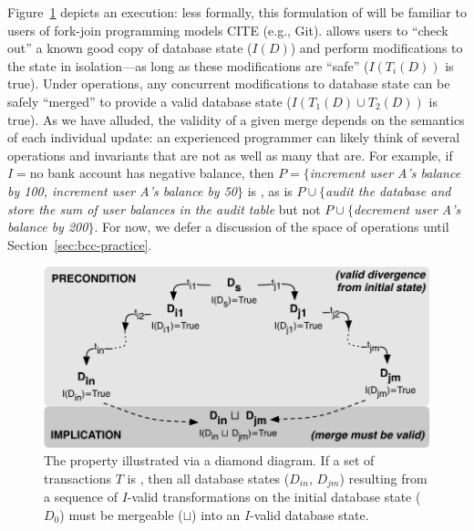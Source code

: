 Figure~\ref{fig:iconfluence} depicts an \iconfluent execution: less
formally, this formulation of \iconfluence will be familiar to users
of fork-join programming models CITE (e.g., Git). \iconfluence allows
users to ``check out'' a known good copy of database state ($I(D)$)
and perform modifications to the state in isolation---as long as these
modifications are ``safe'' ($I(T_i(D))$ is true). Under \iconfluent
operations, any concurrent modifications to database state can be
safely ``merged'' to provide a valid database state ($I(T_1(D) \cup
T_2(D))$ is true). As we have alluded, the validity of a given merge
depends on the semantics of each individual update: an experienced
programmer can likely think of several operations and invariants that
are not \iconfluent as well as many that are. For example, if $I=$no
bank account has negative balance, then $P=\{$\textit{increment user
  A's balance by 100, increment user A's balance by 50}$\}$ is
\iconfluent, as is $P\cup\{$\textit{audit the database and store the
  sum of user balances in the \textrm{audit} table} but not
$P\cup\{$\textit{decrement user A's balance by 200}$\}$. For now, we
defer a discussion of the space of operations until
Section~\ref{sec:bcc-practice}.

\begin{figure}
\begin{center}
\includegraphics[width=\columnwidth]{figs/icommute.pdf}
\end{center}
\caption{The \iconfluence property illustrated via a diamond
  diagram. If a set of transactions $T$ is \iconfluent, then all
  database states ($D_{in}$, $D_{jm}$) resulting from a sequence of
  $I$-valid transformations on the initial database state ($D_0$) must
  be mergeable ($\sqcup$) into an $I$-valid database state.}
\label{fig:iconfluence}
\end{figure}

